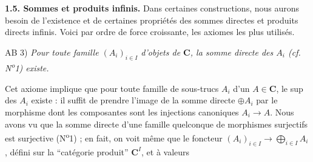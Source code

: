 \noindent\textbf{1.5. Sommes et produits infinis.}
Dans certaines constructions, nous aurons besoin de l'existence et de
certaines propriétés des sommes directes et produits directs infinis. Voici
par ordre de force croissante, les axiomes les plus utilisés.

\noindent AB 3) \textit{Pour toute famille $(A_i)_{i\in I}$ d'objets
de $\mathbf{C}$, la somme directe des $A_i$ (cf. N\textsuperscript{o}1) existe.}

Cet axiome implique que pour toute famille de sous-trucs $A_i$ d'un $A\in\mathbf{C}$,
le sup des $A_i$ existe : il suffit de prendre l'image de la somme directe
$\oplus A_i$ par le morphisme dont les composantes sont les
injections canoniques $A_i\to A$. Nous avons vu que la somme
directe d'une famille quelconque de morphismes surjectifs est surjective
(N\textsuperscript{o}1) ; en fait, on voit même que le foncteur $(A_i)_{i\in I}\to\displaystyle\bigoplus_{i\in I}A_i$, défini sur la ``catégorie produit'' $\mathbf{C}^I$, et à valeurs

